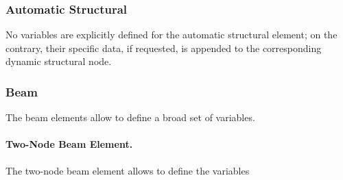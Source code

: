 \subsubsection{Automatic Structural}
\label{sec:NetCDF:Elem:Automatic Structural}
No variables are explicitly defined for the automatic structural
element; on the contrary, their specific data, if requested,
is appended to the corresponding dynamic structural node.


\subsubsection{Beam}
\label{sec:NetCDF:Elem:Beam}

The beam elements allow to define a broad set of variables.

\paragraph{Two-Node Beam Element.}
The two-node beam element allows to define the variables
